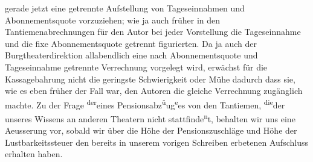 \begin{ledgroupsized}[t]{13cm}
               gerade jetzt eine getrennte Aufstellung von Tageseinnahmen und Abonnementsquote
               vorzuziehen; wie ja auch früher in den Tantiemenabrechnungen für den Autor bei jeder
               Vorstellung die Tageseinnahme und die fixe Abonnementsquote getrennt figurierten.\pend
           \pstart
           Da ja auch der Burgtheaterdirektion allabendlich
               eine nach Abonnementsquote und Tageseinnahme getrennte Verrechnung vorgelegt wird,
               erwächst für die Kassagebahrung nicht die geringste Schwierigkeit oder Mühe dadurch
               dass sie, wie es eben früher der Fall war, den Autoren die gleiche Verrechnung zu{\pb}gänglich machte.\pend
           \pstart
           Zu der Frage \substVorne{}\textsuperscript{der}\substDazwischen{}eines\substHinten{} Pensionsabz\substVorne{}\textsuperscript{ü}\substDazwischen{}u\substHinten{}g\substVorne{}\textsuperscript{e}\substDazwischen{}es\substHinten{} von den Tantiemen, \substVorne{}\textsuperscript{die}\substDazwischen{}der\substHinten{} unseres Wissens an anderen Theatern  nicht stattfinde\substVorne{}\textsuperscript{n}\substDazwischen{}t\substHinten{}, behalten wir uns eine Aeusserung vor, sobald wir über die Höhe der
               Pensionszuschläge und Höhe der Lustbarkeitssteuer den bereits in unserem vorigen
               Schreiben erbetenen Aufschluss erhalten haben.\pend
           \endnumbering{}\end{ledgroupsized}  \newcommand{\dateiname}{L02409}\newcommand{\titel}{Arthur Schnitzler an Richard Beer-Hofmann, 21. 1. 1924}\newcommand{\editorInnen}{Martin Anton Müller und Gerd-Hermann Susen}
      